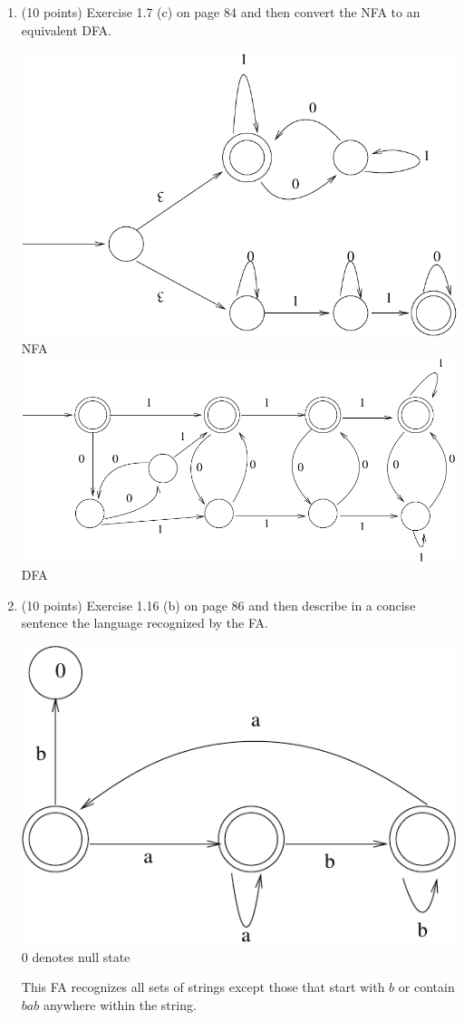\documentclass[11pt]{article}
\begin{document}
\begin{enumerate}
  \item (10 points) Exercise 1.7 (c) on page 84 and then convert the NFA to an equivalent DFA.
  \begin{center}
    \includegraphics[scale=.4] {fig2.pdf} \\
     NFA \\
    \includegraphics[scale=.4]{fig3.pdf} \\
     DFA
   \end{center}

  \item (10 points) Exercise 1.16 (b) on page 86 and then describe in a concise sentence the language recognized by 
  the FA.
  \begin{center}
    \includegraphics[scale=.4] {fig4.pdf} \\
    0 denotes null state
  \end{center}
  This FA recognizes all sets of strings except those that start with $b$ or contain $bab$ anywhere within the string.


\end{enumerate}
\end{document}
